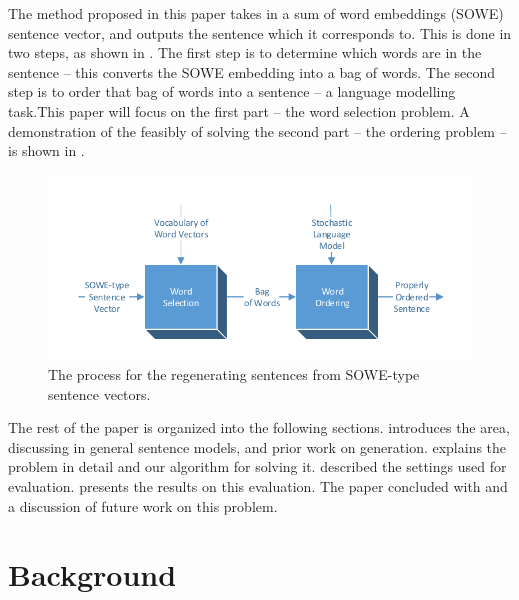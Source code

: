 \documentclass[11pt]{article}
\numberwithin{equation}{section}
\numberwithin{figure}{section}
\theoremstyle{plain}
\theoremstyle{definition}
\begin{document}
The method proposed in this paper takes in a sum of word embeddings (SOWE) sentence vector, and outputs the sentence which it corresponds to. This is done in two steps, as shown in . The first step is to determine which words are in the sentence -- this converts the SOWE embedding into a bag of words. The second step is to order that bag of words into a sentence -- a language modelling task.This paper will focus on the first part -- the word selection problem. A demonstration of the feasibly of solving the second part -- the ordering problem --  is shown in .

\begin{figure}
	\centering 
	\includegraphics[width=\columnwidth]{block_diagram}
	\caption{The process for the regenerating sentences from SOWE-type sentence vectors.}
	\label{block_diagram}
\end{figure}

The rest of the paper is organized into the following sections.  introduces the area, discussing in general sentence models, and prior work on generation.  explains the problem in detail and our algorithm for solving it.  described the settings used for evaluation.  presents the results on this evaluation. The paper concluded with  and a discussion of future work on this problem.


\section{Background}\label{relwork}
\end{document}
